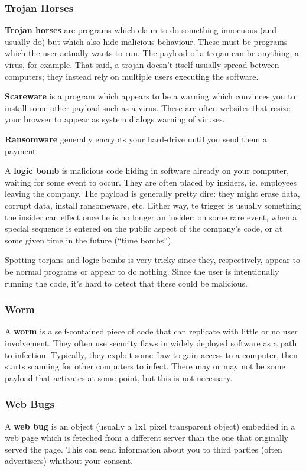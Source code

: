 \documentclass[12pt]{article}
\begin{document}
\subsubsection{Trojan Horses}
{\bf Trojan horses} are programs which claim to do something innocuous (and usually do) but which also hide malicious behaviour. These must be programs which the user actually wants to run. The payload of a trojan can be anything; a virus, for example. That said, a trojan doesn't itself usually spread between computers; they instead rely on multiple users executing the software.

{\bf Scareware} is a program which appears to be a warning which convinces you to install some other payload such as a virus. These are often websites that resize your browser to appear as system dialogs warning of viruses.

{\bf Ransomware} generally encrypts your hard-drive until you send them a payment.

A {\bf logic bomb} is malicious code hiding in software already on your computer, waiting for some event to occur. They are often placed by insiders, ie. employees leaving the company. The payload is generally pretty dire: they might erase data, corrupt data, install ransomeware, etc. Either way, te trigger is usually something the insider can effect once he is no longer an insider: on some rare event, when a special sequence is entered on the public aspect of the company's code, or at some given time in the future (``time bombs'').

Spotting torjans and logic bombs is very tricky since they, respectively, appear to be normal programs or appear to do nothing. Since the user is intentionally running the code, it's hard to detect that these could be malicious.

\subsubsection{Worm}
A {\bf worm} is a self-contained piece of code that can replicate with little or no user involvement. They often use security flaws in widely deployed software as a path to infection. Typically, they exploit some flaw to gain access to a computer, then starts scanning for other computers to infect. There may or may not be some payload that activates at some point, but this is not necessary.

\subsubsection{Web Bugs}
A {\bf web bug} is an object (usually a 1x1 pixel transparent object) embedded in a web page which is feteched from a different server than the one that originally served the page. This can send information about you to third parties (often advertisers) whithout your consent.
\end{document}
